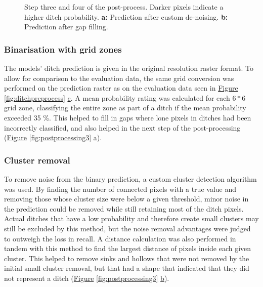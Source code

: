 \documentclass[]{interact}
\theoremstyle{plain}%
\theoremstyle{definition}
\theoremstyle{remark}
\begin{document}
\begin{figure} [!htb]
    \caption{Step three and four of the post-process. Darker pixels indicate a higher ditch probability. \textbf{a: }Prediction after custom de-noising. \textbf{b: }Prediction after gap filling.}
    \label{fig:postprocessing2}
\end{figure}

\subsubsection{Binarisation with grid zones}
The models' ditch prediction is given in the original resolution raster format. To allow for comparison to the evaluation data, the same grid conversion was performed on the prediction raster as on the evaluation data seen in \hyperref[fig:ditchpreprocess]{Figure} \ref{fig:ditchpreprocess} \hyperref[fig:ditchpreprocess]{c}. A mean probability rating was calculated for each $6*6$ grid zone, classifying the entire zone as part of a ditch if the mean probability exceeded 35 \%. This helped to fill in gaps where lone pixels in ditches had been incorrectly classified, and also helped in the next step of the post-processing (\hyperref[fig:postprocessing3]{Figure} \ref{fig:postprocessing3} \hyperref[fig:postprocessing3]{a}).

\subsubsection{Cluster removal}
To remove noise from the binary prediction, a custom cluster detection algorithm was used. By finding the number of connected pixels with a true value and removing those whose cluster size were below a given threshold, minor noise in the prediction could be removed while still retaining most of the ditch pixels. Actual ditches that have a low probability and therefore create small clusters may still be excluded by this method, but the noise removal advantages were judged to outweigh the loss in recall. A distance calculation was also performed in tandem with this method to find the largest distance of pixels inside each given cluster. This helped to remove sinks and hollows that were not removed by the initial small cluster removal, but that had a shape that indicated that they did not represent a ditch (\hyperref[fig:postprocessing3]{Figure} \ref{fig:postprocessing3} \hyperref[fig:postprocessing3]{b}).
\end{document}
